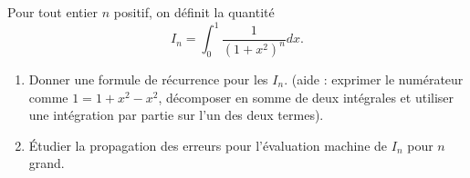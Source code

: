 
\begin{exercice}\label{exoexamens-0001}

	Pour tout entier $n$ positif, on définit la quantité 
	\begin{equation}
		I_n=\int_0^1\frac{1}{ (1+x^2)^n }dx.
	\end{equation}
	\begin{enumerate}
		\item
			Donner une formule de récurrence pour les $I_n$. (aide : exprimer le numérateur comme $1=1+x^2-x^2$, décomposer en somme de deux intégrales et utiliser une intégration par partie sur l'un des deux termes).
		\item
			Étudier la propagation des erreurs pour l'évaluation machine de $I_n$ pour $n$ grand.
	\end{enumerate}

\end{exercice}
